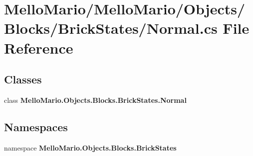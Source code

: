 \section{Mello\+Mario/\+Mello\+Mario/\+Objects/\+Blocks/\+Brick\+States/\+Normal.cs File Reference}
\label{Blocks_2BrickStates_2Normal_8cs}
\subsection*{Classes}
\begin{DoxyCompactItemize}
\item 
class \textbf{ Mello\+Mario.\+Objects.\+Blocks.\+Brick\+States.\+Normal}
\end{DoxyCompactItemize}
\subsection*{Namespaces}
\begin{DoxyCompactItemize}
\item 
namespace \textbf{ Mello\+Mario.\+Objects.\+Blocks.\+Brick\+States}
\end{DoxyCompactItemize}
